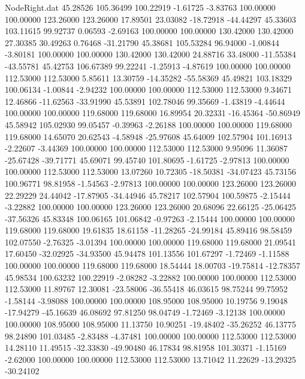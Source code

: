\begin{filecontents}{NodeRight.dat}
  45.28526  105.36499  100.22919    -1.61725   -3.83763  100.00000  100.00000  123.26000  123.26000   17.89501   23.03082  -18.72918  -44.44297
  45.33603  103.11615   99.92737     0.06593   -2.69163  100.00000  100.00000  130.42000  130.42000   27.30385   30.49263    0.76468  -31.21790
  45.38681  105.53284   96.94000    -1.00844   -3.80181  100.00000  100.00000  130.42000  130.42000   24.88716   33.48000  -11.55384  -43.55781
  45.42753  106.67389   99.22241    -1.25913   -4.87619  100.00000  100.00000  112.53000  112.53000    5.85611   13.30759  -14.35282  -55.58369
  45.49821  103.18329  100.06134    -1.00844   -2.94232  100.00000  100.00000  112.53000  112.53000    9.34671   12.46866  -11.62563  -33.91990
  45.53891  102.78046   99.35669    -1.43819   -4.44644  100.00000  100.00000  119.68000  119.68000   16.89954   20.32331  -16.45364  -50.86949
  45.58942  105.02930   99.05457    -0.39963   -2.26188  100.00000  100.00000  119.68000  119.68000   14.65070   20.62543   -4.58948  -25.97608
  45.64009  102.57904  101.16913    -2.22607   -3.44369  100.00000  100.00000  112.53000  112.53000    9.95096   11.36087  -25.67428  -39.71771
  45.69071   99.45740  101.80695    -1.61725   -2.97813  100.00000  100.00000  112.53000  112.53000   13.07260   10.72305  -18.50381  -34.07423
  45.73156  100.96771   98.81958    -1.54563   -2.97813  100.00000  100.00000  123.26000  123.26000   22.29229   24.44042  -17.87905  -34.44946
  45.78217  102.57904  100.59875    -2.15444   -3.22882  100.00000  100.00000  123.26000  123.26000   20.68096   22.66125  -25.06425  -37.56326
  45.83348  100.06165  101.06842    -0.97263   -2.15444  100.00000  100.00000  119.68000  119.68000   19.61835   18.61158  -11.28265  -24.99184
  45.89416   98.58459  102.07550    -2.76325   -3.01394  100.00000  100.00000  119.68000  119.68000   21.09541   17.60450  -32.02925  -34.93500
  45.94478  101.13556  101.67297    -1.72469   -1.11588  100.00000  100.00000  119.68000  119.68000   18.54444   18.00703  -19.75814  -12.78357
  45.98534  100.63232  100.22919    -2.08282   -3.22882  100.00000  100.00000  112.53000  112.53000   11.89767   12.30081  -23.58006  -36.55418
  46.03615   98.75244   99.75952    -1.58144   -3.98088  100.00000  100.00000  108.95000  108.95000   10.19756    9.19048  -17.94279  -45.16639
  46.08692   97.81250   98.04749    -1.72469   -3.12138  100.00000  100.00000  108.95000  108.95000   11.13750   10.90251  -19.48402  -35.26252
  46.13775   98.24890  101.03485    -2.83488   -4.37481  100.00000  100.00000  112.53000  112.53000   14.28110   11.49515  -32.33830  -49.90480
  46.17834   98.81958  101.30371    -1.15169   -2.62000  100.00000  100.00000  112.53000  112.53000   13.71042   11.22629  -13.29325  -30.24102

\end{filecontents}
